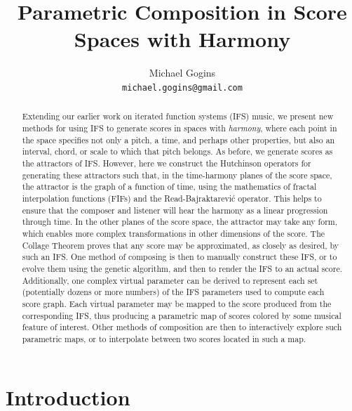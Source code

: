 \documentclass[english,11pt,letterpaper,onecolumn]{scrartcl}
\numberwithin{equation}{section}
\begin{document}
\title{Parametric Composition in Score Spaces with Harmony} \author{Michael
Gogins \\ \texttt{michael.gogins@gmail.com}} \maketitle

\begin{abstract}
Extending our earlier work on iterated function systems (IFS) music, we present
new methods for using IFS to generate scores in spaces with \emph{harmony},
where each point in the space specifies not only a pitch, a time, and perhaps
other properties, but also an interval, chord, or scale to which that pitch
belongs. As before, we generate scores as the attractors of IFS. However, here
we construct the Hutchinson operators for generating these attractors such that,
in the time-harmony planes of the score space, the attractor is the graph of a
function of time, using the mathematics of fractal interpolation functions
(FIFs) and the Read-Bajraktarevi\'c operator. This helps to ensure that the
composer and listener will hear the harmony as a linear progression through
time. In the other planes of the score space, the attractor may take any form,
which enables more complex transformations in other dimensions of the score. The
Collage Theorem proves that any score may be approximated, as closely as
desired, by such an IFS. One method of composing is then to manually construct
these IFS, or to evolve them using the genetic algorithm, and then to render the
IFS to an actual score. Additionally, one complex virtual parameter can be
derived to represent each set (potentially dozens or more numbers) of the IFS
parameters used to compute each score graph. Each virtual parameter may be
mapped to the score produced from the corresponding IFS, thus producing a
parametric map of scores colored by some musical feature of interest. Other
methods of composition are then to interactively explore such parametric maps,
or to interpolate between two scores located in such a map.
\end{abstract}


\section{Introduction}

\end{document}
